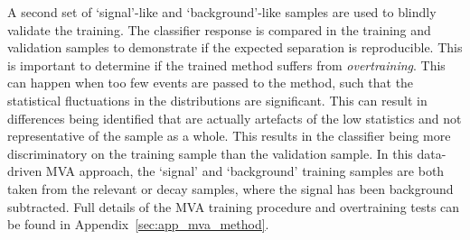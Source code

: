 A second set of `signal'-like and `background'-like samples are used to blindly validate the training. The classifier response is compared in the training and validation samples to demonstrate if the expected separation is reproducible. 
This is important to determine if the trained method suffers from \emph{overtraining}. This can happen when too few events are passed to the method, such that the statistical fluctuations in the distributions are significant. This can result in differences being identified that are actually artefacts of the low statistics and not representative of the sample as a whole. This results in the classifier being more discriminatory on the training sample than the validation sample.
In this data-driven MVA approach, the `signal' and `background' training samples are both taken from the relevant \decay{\Bsb}{\Dsp\pim} or \decay{\Bs}{\jpsi\phiz} decay samples, where the signal has been background subtracted.
Full details of the MVA training procedure and overtraining tests can be found in Appendix~\ref{sec:app_mva_method}.








